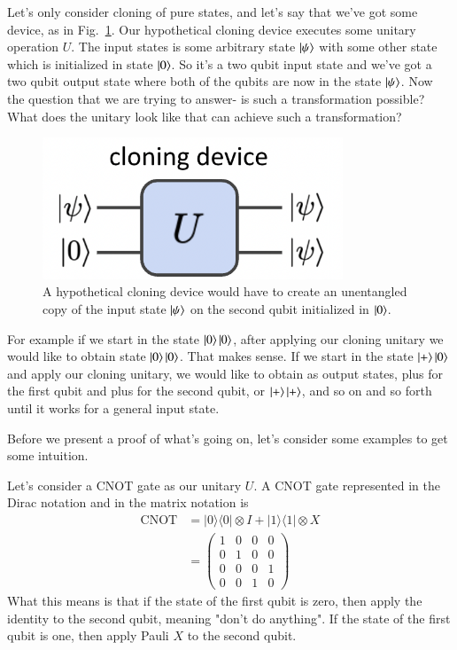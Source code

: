 Let's only consider cloning of pure states, and let's say that we've got some device, as in Fig.~\ref{fig:cloner}. Our hypothetical cloning device executes some unitary operation $U$. The input states is some arbitrary state $\left| \psi \right\rangle$ with some other state which is initialized in state $\left| 0 \right\rangle$. So it's a two qubit input state and we've got a two qubit output state where both of the qubits are now in the state $\left| \psi \right\rangle$. Now the question that we are trying to answer- is such a transformation possible? What does the unitary look like that can achieve such a transformation?
\begin{figure}[H]
    \centering
    \includegraphics[width=0.8\textwidth]{lesson8/cloning-device.png}
        \caption{A hypothetical cloning device would have to create an unentangled copy of the input state $\left| \psi \right\rangle$ on the second qubit initialized in $\left| 0 \right\rangle$.}
    \label{fig:cloner}
\end{figure}

For example if we start in the state $\left| 0 \right\rangle\left| 0 \right\rangle$, after applying our cloning unitary we would like to obtain state $\left| 0 \right\rangle\left| 0 \right\rangle$. That makes sense. If we start in the state $\left| + \right\rangle\left| 0 \right\rangle$ and apply our cloning unitary, we would like to obtain as output states, plus for the first qubit and plus for the second qubit, or $\left| + \right\rangle\left| + \right\rangle$, and so on and so forth until it works for a general input state.

Before we present a proof of what's going on, let's consider some examples to get some intuition.

Let's consider a CNOT gate as our unitary $U$. A CNOT gate represented in the Dirac notation and in the matrix notation is
\begin{equation}
\begin{aligned}
\operatorname{CNOT} &=|0\rangle\langle 0|\otimes I+| 1\rangle\langle 1| \otimes X \\
&=\left(\begin{array}{llll}
1 & 0 & 0 & 0 \\
0 & 1 & 0 & 0 \\
0 & 0 & 0 & 1 \\
0 & 0 & 1 & 0
\end{array}\right)
\end{aligned}
\end{equation}
What this means is that if the state of the first qubit is zero, then apply the identity to the second qubit, meaning "don't do anything". If the state of the first qubit is one, then apply Pauli $X$ to the second qubit.

